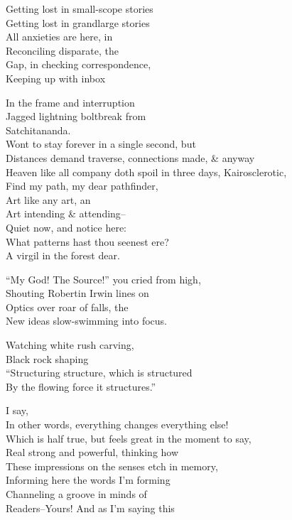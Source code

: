Getting lost in small-scope stories \\
Getting lost in grandlarge stories \\
All anxieties are here, in \\
Reconciling disparate, the \\ 
Gap, in checking correspondence, \\
Keeping up with inbox 

In the frame and interruption \\
Jagged lightning boltbreak from \\
Satchitananda. \\
Wont to stay forever in a single second, but \\
Distances demand traverse, connections made, \& anyway \\
Heaven like all company doth spoil in three days,
Kairosclerotic, \\
Find my path, my dear pathfinder, \\
Art like any art, an \\
Art intending \& attending-- \\
Quiet now, and notice here: \\
What patterns hast thou seenest ere? \\
A virgil in the forest dear.

``My God! The Source!'' you cried from high, \\
Shouting Robertin Irwin lines on \\
Optics over roar of falls, the \\
New ideas slow-swimming into focus.

Watching white rush carving, \\
Black rock shaping \\
``Structuring structure, which is structured \\
By the flowing force it structures.''

I say, \\
In other words, everything changes everything else! \\
Which is half true, but feels great in the moment to say, \\
Real strong and powerful, thinking how \\
These impressions on the senses etch in memory, \\
Informing here the words I'm forming \\
Channeling a groove in minds of \\
Readers--Yours! And as I'm saying this

